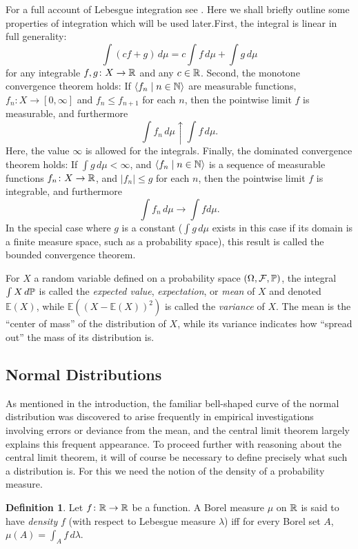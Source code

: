 \documentclass[leqno]{article}
\theoremstyle{definition}
\newtheorem{definition}[theorem]{Definition}
\newcommand{\bldseq}[2]{\langle{#1}\mid{#2}\rangle}
\renewcommand{\E}{\mathbb E}
\begin{document}
For a full account of Lebesgue integration see \cite{billingsley}. Here we shall briefly outline some properties of integration which will be used later.First, the integral is linear in full generality:
\[ \int (cf + g) \, d\mu = c\int f \, d\mu + \int g \, d\mu \]
for any integrable $f,g\colon X \rightarrow \R$ and any $c \in \R$. Second, the monotone convergence theorem holds: If $\bldseq{f_n}{n \in \N}$ are measurable functions, $f_n\colon X \rightarrow [0,\infty]$ and $f_n \le f_{n+1}$ for each $n$, then the pointwise limit $f$ is measurable, and furthermore
\[ \int f_n \, d\mu \uparrow \int f \, d\mu. \]
Here, the value $\infty$ is allowed for the integrals.
Finally, the dominated convergence theorem holds: If $\int g \, d\mu < \infty$, and $\bldseq{f_n}{n \in \N}$ is a sequence of measurable functions $f_n\colon X \rightarrow \R$, and $|f_n| \le g$ for each $n$, then the pointwise limit $f$ is integrable, and furthermore
\[ \int f_n \, d\mu \rightarrow \int f d\mu. \]
In the special case where $g$ is a constant ($\int g \, d\mu$ exists in this case if its domain is a finite measure space, such as a probability space), this result is called the bounded convergence theorem.

For $X$ a random variable defined on a probability space $(\Omega, \mathcal F, \P)$, the integral $\int X \, d\P$ is called the {\em expected value}, {\em expectation}, or {\em mean} of $X$ and denoted $\E(X)$, while $\E((X - \E(X))^2)$ is called the {\em variance} of $X$. The mean is the ``center of mass'' of the distribution of $X$, while its variance indicates how ``spread out'' the mass of its distribution is.

\subsection{Normal Distributions}

As mentioned in the introduction, the familiar bell-shaped curve of the normal distribution was discovered to arise frequently in empirical investigations involving errors or deviance from the mean, and the central limit theorem largely explains this frequent appearance. To proceed further with reasoning about the central limit theorem, it will of course be necessary to define precisely what such a distribution is. For this we need the notion of the density of a probability measure.

\begin{definition}
Let $f\colon \R \rightarrow \R$ be a function. A Borel measure $\mu$ on $\R$ is said to have {\em density} $f$ (with respect to Lebesgue measure $\lambda$) iff for every Borel set $A$, $\mu(A) = \int_A f \, d\lambda$.
\end{definition}
\end{document}
